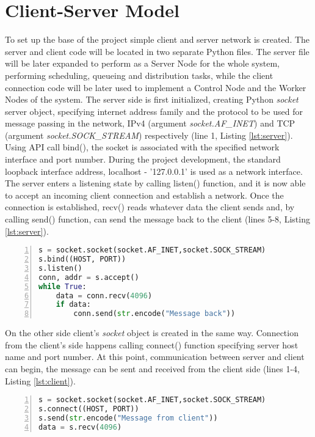 \documentclass[10pt]{report}
\begin{document}
\section{Client-Server Model}

To set up the base of the project simple client and server network is created. The server and client code will be located in two separate Python files. The server file will be later expanded to perform as a Server Node for the whole system, performing scheduling, queueing and distribution tasks, while the client connection code will be later used to implement a Control Node and the Worker Nodes of the system. The server side is first initialized, creating Python \textit{socket} server object, specifying internet address family and the protocol to be used for message passing in the network, IPv4 (argument \textit{socket.AF\_INET}) and TCP (argument \textit{socket.SOCK\_STREAM}) respectively (line 1, Listing \ref{lst:server}). Using API call bind(), the socket is associated with the specified network interface and port number. During the project development, the standard loopback interface address, localhost - '127.0.0.1' is used as a network interface. The server enters a listening state by calling listen() function, and it is now able to accept an incoming client connection and establish a network. Once the connection is established, recv() reads whatever data the client sends and, by calling send() function, can send the message back to the client (lines 5-8, Listing \ref{lst:server}).
\begin{lstlisting}[numbers=left, language=Python, caption={Server socket}, label={lst:server}]
s = socket.socket(socket.AF_INET,socket.SOCK_STREAM)
s.bind((HOST, PORT))
s.listen()
conn, addr = s.accept()
while True:
    data = conn.recv(4096)
    if data:
        conn.send(str.encode("Message back"))
\end{lstlisting}
On the other side client's \textit{socket} object is created in the same way. Connection from the client's side happens calling connect() function specifying server host name and port number. At this point, communication between server and client can begin, the message can be sent and received from the client side (lines 1-4, Listing \ref{lst:client}).
\begin{lstlisting}[numbers=left, language=Python, caption={Client socket}, label={lst:client}]
s = socket.socket(socket.AF_INET,socket.SOCK_STREAM)
s.connect((HOST, PORT))
s.send(str.encode("Message from client"))
data = s.recv(4096)
\end{lstlisting}
\end{document}
